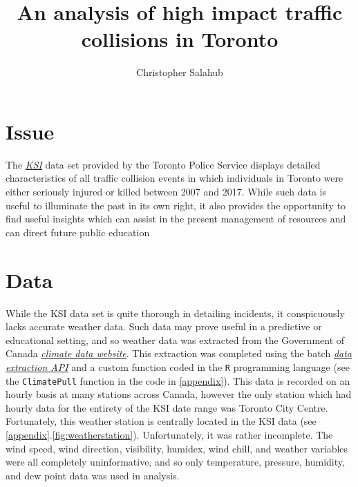 \documentclass{article}
\title{An analysis of high impact traffic collisions in Toronto}
\author{Christopher Salahub}
\begin{document}
\maketitle

\section{Issue} \label{sec:Issue}

The
\href{http://data.torontopolice.on.ca/datasets/ksi?geometry=-80.249%2C43.55%2C-78.515%2C43.897&selectedAttribute=IMPACTYPE}{\textit{KSI}}
data set provided by the Toronto Police Service displays detailed characteristics of all traffic collision events in which
individuals in Toronto were either seriously injured or killed between 2007 and 2017. While such data is useful to illuminate the past in its own right,
it also provides the opportunity to find useful insights which can assist in the present management of resources and can direct future public education

\section{Data} \label{sec:Data}

While the KSI data set is quite thorough in detailing incidents, it conspicuously lacks accurate weather data. Such data may prove
useful in a predictive or educational setting, and so weather data was extracted from the Government of Canada
\href{http://climate.weather.gc.ca/index_e.html}{\textit{climate data website}}. This extraction was completed using the batch
\href{ftp://ftp.tor.ec.gc.ca/Pub/Get_More_Data_Plus_de_donnees/Readme.txt}{\textit{data extraction API}} and a custom function coded in the \texttt{R} programming language (see the \texttt{ClimatePull} function in the code in \ref{appendix}). This data is recorded on
an hourly basis at many stations across Canada, however the only station which had hourly data for the entirety of the KSI date
range was Toronto City Centre. Fortunately, this weather station is centrally located in the KSI data (see
\ref{appendix}.\ref{fig:weatherstation}). Unfortunately, it was rather incomplete. The wind speed, wind direction, visibility, humidex, wind
chill, and weather variables were all completely uninformative, and so only temperature, pressure, humidity, and dew point data
was used in analysis.
\end{document}
